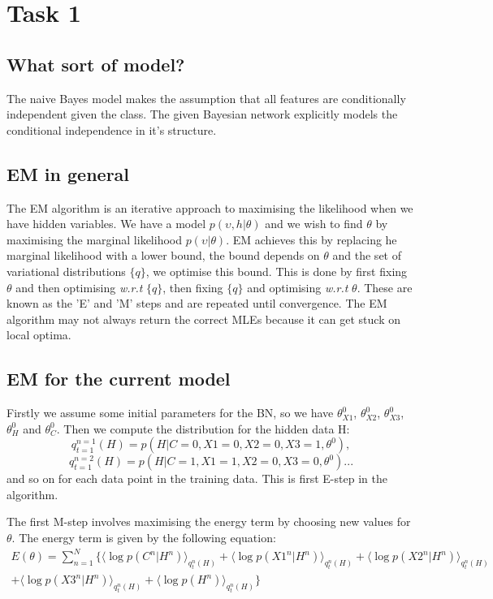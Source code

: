 \documentclass[12pt]{article} %
\begin{document}
\section{Task 1} %


\subsection{What sort of model?} %
The naive Bayes model makes the assumption that all features are conditionally independent given the class. The given Bayesian network explicitly models the conditional independence in it's structure.

\subsection{EM in general}
The EM algorithm is an iterative approach to maximising the likelihood when we have hidden variables. We have a model $p(\upsilon,h|\theta)$ and we wish to find $\theta$ by maximising the marginal likelihood $p(\upsilon|\theta)$. EM achieves this by replacing he marginal likelihood with a lower bound, the bound depends on $\theta$ and the set of variational distributions $\{q\}$, we optimise this bound. This is done by first fixing $\theta$ and then optimising \textit{w.r.t} $\{q\}$, then fixing $\{q\}$ and optimising \textit{w.r.t} $\theta$. These are known as the 'E' and 'M' steps and are repeated until convergence. The EM algorithm may not always return the correct MLEs because it can get stuck on local optima.

\subsection{EM for the current model}
Firstly we assume some initial parameters for the BN, so we have $\theta_{X1}^0$, $\theta_{X2}^0$, $\theta_{X3}^0$, $\theta_{H}^0$ and $\theta_{C}^0$. Then we compute the distribution for the hidden data H:
$$
q_{t=1}^{n=1}(H)=p(H|C=0,X1=0,X2=0,X3=1,\theta^0),
$$
$$
q_{t=1}^{n=2}(H)=p(H|C=1,X1=1,X2=0,X3=0,\theta^0)...
$$
and so on for each data point in the training data. This is first E-step in the algorithm.

The first M-step involves maximising the energy term by choosing new values for $\theta$. The energy term is given by the following equation:
\begin{multline}
E(\theta) = \displaystyle\sum_{n=1}^{N}
\{
\langle\log p(C^n|H^n) \rangle_{q_t^n(H)} +
\langle\log p(X1^n|H^n) \rangle_{q_t^n(H)} + 
\langle\log p(X2^n|H^n) \rangle_{q_t^n(H)} \\ +
\langle\log p(X3^n|H^n) \rangle_{q_t^n(H)} + 
\langle\log p(H^n) \rangle_{q_t^n(H)}
\}
\end{multline}
\end{document}
